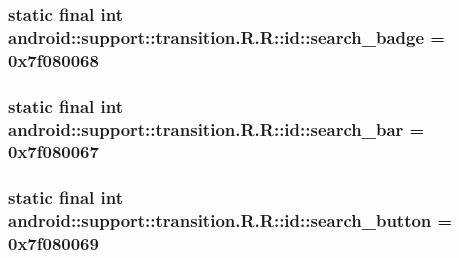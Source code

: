 \hypertarget{classandroid_1_1support_1_1transition_1_1_r_1_1id_2eb5ac76c0f227085ab44582fabbc3dd}{
\subsubsection[{search\_\-badge}]{\setlength{\rightskip}{0pt plus 5cm}static final int android::support::transition.R.R::id::search\_\-badge = 0x7f080068}}
\label{classandroid_1_1support_1_1transition_1_1_r_1_1id_2eb5ac76c0f227085ab44582fabbc3dd}


\hypertarget{classandroid_1_1support_1_1transition_1_1_r_1_1id_9d87b7b30db6917838dd56350997435a}{
\subsubsection[{search\_\-bar}]{\setlength{\rightskip}{0pt plus 5cm}static final int android::support::transition.R.R::id::search\_\-bar = 0x7f080067}}
\label{classandroid_1_1support_1_1transition_1_1_r_1_1id_9d87b7b30db6917838dd56350997435a}


\hypertarget{classandroid_1_1support_1_1transition_1_1_r_1_1id_26f3cb5a12d4886747174b31b0350e2a}{
\subsubsection[{search\_\-button}]{\setlength{\rightskip}{0pt plus 5cm}static final int android::support::transition.R.R::id::search\_\-button = 0x7f080069}}
\label{classandroid_1_1support_1_1transition_1_1_r_1_1id_26f3cb5a12d4886747174b31b0350e2a}


